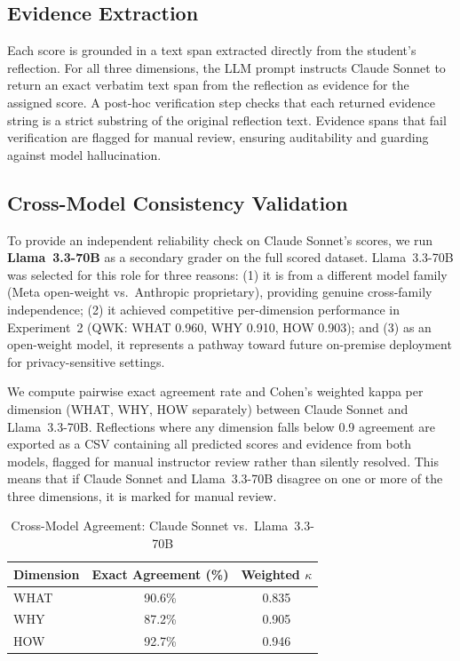 \documentclass[11pt]{article}
\begin{document}
\subsection{Evidence Extraction}

Each score is grounded in a text span extracted directly from the student's reflection. For all three dimensions, the LLM prompt instructs Claude Sonnet to return an exact verbatim text span from the reflection as evidence for the assigned score. A post-hoc verification step checks that each returned evidence string is a strict substring of the original reflection text. Evidence spans that fail verification are flagged for manual review, ensuring auditability and guarding against model hallucination.

\subsection{Cross-Model Consistency Validation}

To provide an independent reliability check on Claude Sonnet's scores, we run \textbf{Llama~3.3-70B} as a secondary grader on the full scored dataset. Llama~3.3-70B was selected for this role for three reasons: (1) it is from a different model family (Meta open-weight vs.\ Anthropic proprietary), providing genuine cross-family independence; (2) it achieved competitive per-dimension performance in Experiment~2 (QWK: WHAT 0.960, WHY 0.910, HOW 0.903); and (3) as an open-weight model, it represents a pathway toward future on-premise deployment for privacy-sensitive settings.

We compute pairwise exact agreement rate and Cohen's weighted kappa per dimension (WHAT, WHY, HOW separately) between Claude Sonnet and Llama~3.3-70B. Reflections where any dimension falls below 0.9 agreement are exported as a CSV containing all predicted scores and evidence from both models, flagged for manual instructor review rather than silently resolved. This means that if Claude Sonnet and Llama~3.3-70B disagree on one or more of the three dimensions, it is marked for manual review.

\begin{table}[H]
\centering
\caption{Cross-Model Agreement: Claude Sonnet vs.\ Llama~3.3-70B}
\label{tab:consistency}
\begin{tabular}{lcc}
\toprule
\textbf{Dimension} & \textbf{Exact Agreement (\%)} & \textbf{Weighted $\kappa$} \\
\midrule
WHAT & 90.6\% & 0.835 \\
WHY  & 87.2\% & 0.905 \\
HOW  & 92.7\% & 0.946 \\
\bottomrule
\end{tabular}
\end{table}
%
\end{document}
